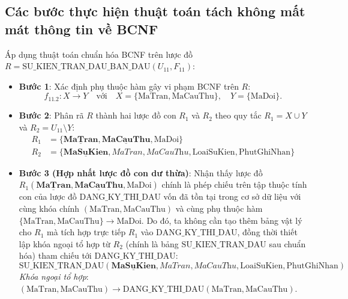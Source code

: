 \subsection{Các bước thực hiện thuật toán tách không mất mát thông tin về BCNF}
Áp dụng thuật toán chuẩn hóa BCNF trên lược đồ $R = \text{SU\_KIEN\_TRAN\_DAU\_BAN\_DAU}(U_{11}, F_{11})$:
\begin{itemize}
    \item \textbf{Bước 1}: Xác định phụ thuộc hàm gây vi phạm BCNF trên $R$:
    $$f_{11.2}: X \rightarrow Y \quad \text{với} \quad X = \{\text{MaTran}, \text{MaCauThu}\}, \quad Y = \{\text{MaDoi}\}.$$
    \item \textbf{Bước 2}: Phân rã $R$ thành hai lược đồ con $R_1$ và $R_2$ theo quy tắc $R_1 = X \cup Y$ và $R_2 = U_{11} \setminus Y$:
    \begin{align*}
        R_1 &= \{\underline{\mathbf{MaTran}}, \underline{\mathbf{MaCauThu}}, \text{MaDoi}\} \\
        R_2 &= \{\underline{\mathbf{MaSuKien}}, \textit{MaTran}, \textit{MaCauThu}, \text{LoaiSuKien}, \text{PhutGhiNhan}\}
    \end{align*}
    \item \textbf{Bước 3 (Hợp nhất lược đồ con dư thừa)}:
    Nhận thấy lược đồ $R_1(\underline{\mathbf{MaTran}}, \underline{\mathbf{MaCauThu}}, \text{MaDoi})$ chính là phép chiếu trên tập thuộc tính con của lược đồ $\text{DANG\_KY\_THI\_DAU}$ vốn đã tồn tại trong cơ sở dữ liệu với cùng khóa chính $(\text{MaTran}, \text{MaCauThu})$ và cùng phụ thuộc hàm $\{\text{MaTran}, \text{MaCauThu}\} \rightarrow \text{MaDoi}$.
    Do đó, ta không cần tạo thêm bảng vật lý cho $R_1$ mà tích hợp trực tiếp $R_1$ vào $\text{DANG\_KY\_THI\_DAU}$, đồng thời thiết lập khóa ngoại tổ hợp từ $R_2$ (chính là bảng $\text{SU\_KIEN\_TRAN\_DAU}$ sau chuẩn hóa) tham chiếu tới $\text{DANG\_KY\_THI\_DAU}$:
    $$\text{SU\_KIEN\_TRAN\_DAU}(\underline{\mathbf{MaSuKien}}, \textit{MaTran}, \textit{MaCauThu}, \text{LoaiSuKien}, \text{PhutGhiNhan})$$
    \textit{Khóa ngoại tổ hợp}: $(\text{MaTran}, \text{MaCauThu}) \rightarrow \text{DANG\_KY\_THI\_DAU}(\text{MaTran}, \text{MaCauThu})$.
\end{itemize}

